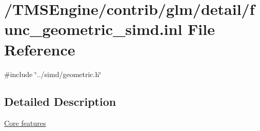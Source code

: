 \hypertarget{func__geometric__simd_8inl}{}\section{/\+T\+M\+S\+Engine/contrib/glm/detail/func\+\_\+geometric\+\_\+simd.inl File Reference}
\label{func__geometric__simd_8inl}
{\ttfamily \#include \char`\"{}../simd/geometric.\+h\char`\"{}}\newline


\subsection{Detailed Description}
\hyperlink{group__core}{Core features} 